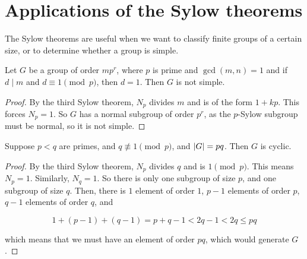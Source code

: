 \documentclass{article}
\begin{document}
    \section{Applications of the Sylow theorems}

    The Sylow theorems are useful when we want to classify finite groups of a certain size, or to determine whether a group is simple.

    \begin{theorem*}
        Let $G$ be a group of order $m p^r$, where $p$ is prime and $\gcd(m, n) = 1$ and if $d \mid m$ and $d \equiv 1 \pmod p$, then $d = 1$. Then $G$ is not simple.
    \end{theorem*}

    \begin{proof}
        By the third Sylow theorem, $N_p$ divides $m$ and is of the form $1 + kp$. This forces $N_p = 1$. So $G$ has a normal subgroup of order $p^r$, as the $p$-Sylow subgroup must be normal, so it is not simple.
    \end{proof}

    \begin{theorem*}
        Suppose $p < q$ are primes, and $q \not \equiv 1 \pmod p$, and $\abs{G} = pq$. Then $G$ is cyclic.
    \end{theorem*}

    \begin{proof}
        By the third Sylow theorem, $N_p$ divides $q$ and is $1 \pmod p$. This means $N_p = 1$. Similarly, $N_q = 1$. So there is only one subgroup of size $p$, and one subgroup of size $q$. Then, there is $1$ element of order $1$, $p - 1$ elements of order $p$, $q - 1$ elements of order $q$, and 
        
        $$1 + (p - 1) + (q - 1) = p + q - 1 < 2q - 1 < 2q \le pq$$

        which means that we must have an element of order $pq$, which would generate $G$.
    \end{proof}
\end{document}
